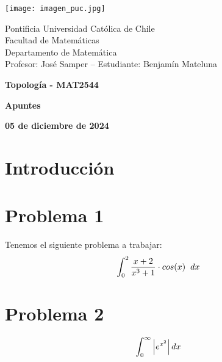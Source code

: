 \documentclass{article}
\begin{document}
\begin{minipage}{2.5cm}
    \texttt{[image: imagen\_puc.jpg]}
\end{minipage}
\begin{minipage}{14cm}
    {\sc Pontificia Universidad Católica de Chile\\
    Facultad de Matemáticas\\
    Departamento de Matemática\\
    Profesor: José Samper -- Estudiante: Benjamín Mateluna}
\end{minipage}
\vspace{1ex}

{\centerline{\bf Topología - MAT2544}
\centerline{\bf Apuntes}}
\centerline{\bf 05 de diciembre de 2024}

\section*{Introducción}

\section*{Problema 1}
\noindent Tenemos el siguiente problema a trabajar:
\begin{equation*}
    \int_{0}^{2}\frac{x+2}{x^{3}+1}\cdot cos(x)\hspace{2mm}dx
\end{equation*}

\section*{Problema 2}
\begin{equation}
    \int_{0}^{\infty}\left|e^{x^{2}} \right|dx
\end{equation}

\end{document}
